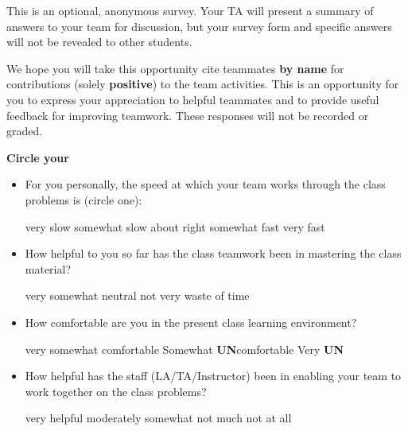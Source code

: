 \documentclass[handout]{mcs}
\begin{document}

This is an optional, anonymous survey.  Your TA will present a summary
of answers to your team for discussion, but your survey form and
specific answers will not be revealed to other students.

We hope you will take this opportunity cite teammates \textbf{by name}
for contributions (solely \textbf{positive}) to the team activities.
This is an opportunity for you to express your appreciation to helpful
teammates and to provide useful feedback for improving teamwork.
These responses will not be recorded or graded.
\begin{center}
\textbf{Circle your}\quad   \teaminfo 
\end{center}

\begin{itemize}

\item For you personally, the speed at which your team works through
  the class problems is (circle one):

very slow\hspace{0.4in} somewhat slow\hspace{0.4in} about
right\hspace{0.4in} somewhat fast\hspace{0.4in} very fast

\item How helpful to you so far has the class teamwork been in
  mastering the class material?

very\hspace{0.5in} somewhat \hspace{0.5in} neutral\hspace{0.5in} not
very \hspace{0.5in} waste of time

\item How comfortable are you in the present class learning environment?

very \hspace{0.5in} somewhat comfortable\hspace{0.5in}
Somewhat \textbf{UN}comfortable \hspace{0.5in} Very \textbf{UN}

\item How helpful has the staff (LA/TA/Instructor) been in enabling
  your team to work together on the class problems?

very helpful \hspace{0.5in} moderately\hspace{0.5in}
somewhat \hspace{0.5in} not much \hspace{0.5in} not at all


\end{itemize}
\end{document}
